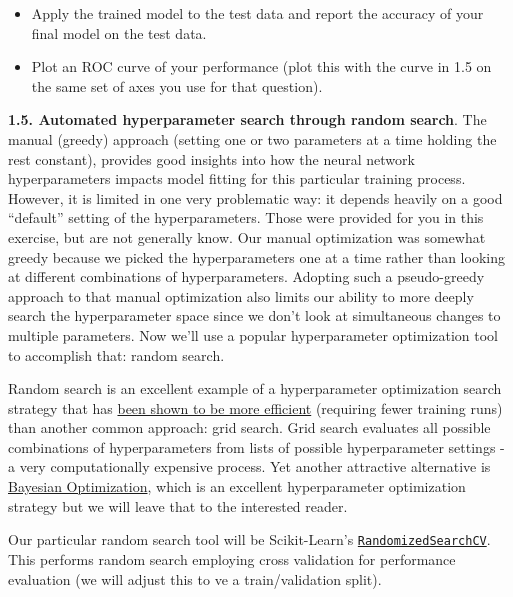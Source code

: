 \documentclass[
  letterpaper,
  DIV=11,
  numbers=noendperiod]{scrartcl}
\providecommand{\tightlist}{%
  \setlength{\itemsep}{0pt}\setlength{\parskip}{0pt}}\usepackage{longtable,booktabs,array}
\begin{document}
\begin{itemize}
\tightlist
\item
  Apply the trained model to the test data and report the accuracy of
  your final model on the test data.
\item
  Plot an ROC curve of your performance (plot this with the curve in 1.5
  on the same set of axes you use for that question).
\end{itemize}

\textbf{1.5. Automated hyperparameter search through random search}. The
manual (greedy) approach (setting one or two parameters at a time
holding the rest constant), provides good insights into how the neural
network hyperparameters impacts model fitting for this particular
training process. However, it is limited in one very problematic way: it
depends heavily on a good ``default'' setting of the hyperparameters.
Those were provided for you in this exercise, but are not generally
know. Our manual optimization was somewhat greedy because we picked the
hyperparameters one at a time rather than looking at different
combinations of hyperparameters. Adopting such a pseudo-greedy approach
to that manual optimization also limits our ability to more deeply
search the hyperparameter space since we don't look at simultaneous
changes to multiple parameters. Now we'll use a popular hyperparameter
optimization tool to accomplish that: random search.

Random search is an excellent example of a hyperparameter optimization
search strategy that has
\href{https://www.jmlr.org/papers/volume13/bergstra12a/bergstra12a?ref=https://githubhelp.com}{been
shown to be more efficient} (requiring fewer training runs) than another
common approach: grid search. Grid search evaluates all possible
combinations of hyperparameters from lists of possible hyperparameter
settings - a very computationally expensive process. Yet another
attractive alternative is
\href{https://arxiv.org/abs/1807.02811}{Bayesian Optimization}, which is
an excellent hyperparameter optimization strategy but we will leave that
to the interested reader.

Our particular random search tool will be Scikit-Learn's
\href{https://scikit-learn.org/stable/modules/generated/sklearn.model_selection.RandomizedSearchCV.html\#sklearn.model_selection.RandomizedSearchCV}{\texttt{RandomizedSearchCV}}.
This performs random search employing cross validation for performance
evaluation (we will adjust this to ve a train/validation split).
\end{document}
